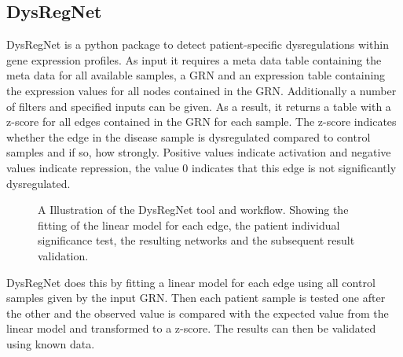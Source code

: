 \documentclass[pdftex,12pt,a4paper]{report}
\begin{document}
\subsection{DysRegNet}

DysRegNet\cite{dysregnet} is a python package to detect patient-specific dysregulations within gene expression profiles. 
As input it requires a meta data table containing the meta data for all available samples, a GRN and an expression table containing the expression values for all nodes contained in the GRN. Additionally a number of filters and specified inputs can be given. 
As a result, it returns a table with a z-score for all edges contained in the GRN for each sample. The z-score indicates whether the edge in the disease sample is dysregulated compared to control samples and if so, how strongly. Positive values indicate activation and negative values indicate repression, the value 0 indicates that this edge is not significantly dysregulated. 
\begin{figure}[!ht]
\begin{center}
	\caption{A Illustration of the DysRegNet tool and workflow. Showing the fitting of the linear model for each edge, the patient individual significance test, the resulting networks and the subsequent result validation\cite{dysregnet}.}
	\label{dysregnet}
\end{center}
\end{figure}

DysRegNet does this by fitting a linear model for each edge using all control samples given by the input GRN. Then each patient sample is tested one after the other and the observed value is compared with the expected value from the linear model and transformed to a z-score. The results can then be validated using known data. 
\end{document}
